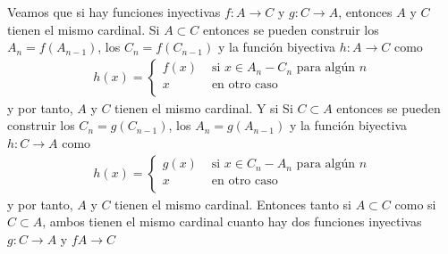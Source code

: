\documentclass{article}
\begin{document}
Veamos que si hay funciones inyectivas $f:A\rightarrow C$ y $g:C\rightarrow A$, entonces $A$ y $C$ tienen el mismo cardinal. Si $A\subset C$ entonces se pueden construir los $A_n=f(A_{n-1})$, los $C_n=f(C_{n-1})$ y la función biyectiva $h:A\rightarrow C$ como
\begin{eqnarray}
h(x)=\begin{cases}
f(x) & \text{ si }x\in A_n-C_n \text{ para algún }n\\
x & \text{ en otro caso }\nonumber\\
\end{cases}
\end{eqnarray} 
y por tanto, $A$ y $C$ tienen el mismo cardinal. Y si Si $C\subset A$ entonces se pueden construir los $C_n=g(C_{n-1})$, los $A_n=g(A_{n-1})$ y la función biyectiva $h:C\rightarrow A$ como
\begin{eqnarray}
h(x)=\begin{cases}
g(x) & \text{ si }x\in C_n-A_n \text{ para algún }n\\
x & \text{ en otro caso }\nonumber\\
\end{cases}
\end{eqnarray} y por tanto, $A$ y $C$ tienen el mismo cardinal. Entonces tanto si $A\subset C$ como si $C\subset A$, ambos tienen el mismo cardinal cuanto hay dos funciones inyectivas $g:C\rightarrow A$ y $fA\rightarrow C$
%
%
\end{document}
